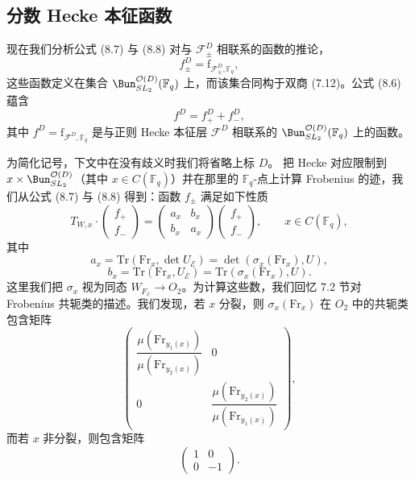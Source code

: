 \subsection{分数 Hecke 本征函数}

现在我们分析公式 (8.7) 与 (8.8) 对与 $\mathcal{F}^D_\pm$ 相联系的函数的推论，
\[
f^D_\pm = \mathrm{f}_{\mathcal{F}^D_\pm,\mathbb{F}_q},
\]
这些函数定义在集合 $\Bun^{\mathcal{O}(D)}_{SL_2}(\mathbb{F}_q)$ 上，而该集合同构于双商 (7.12)。公式 (8.6) 蕴含
\begin{equation}\tag{8.10}
f^D = f^D_+ + f^D_-,
\end{equation}
其中 $f^D = \mathrm{f}_{\mathcal{F}^D,\mathbb{F}_q}$ 是与正则 Hecke 本征层 $\mathcal{F}^D$ 相联系的 $\Bun^{\mathcal{O}(D)}_{SL_2}(\mathbb{F}_q)$ 上的函数。

为简化记号，下文中在没有歧义时我们将省略上标 $D$。
把 Hecke 对应限制到 $x\times \Bun^{\mathcal{O}(D)}_{SL_2}$（其中 $x\in C(\mathbb{F}_q)$）并在那里的 $\mathbb{F}_q$-点上计算 Frobenius 的迹，我们从公式 (8.7) 与 (8.8) 得到：函数 $f_\pm$ 满足如下性质
\begin{equation}\tag{8.11}
T_{W,x}\cdot \begin{pmatrix} f_+\\ f_-\end{pmatrix} = \begin{pmatrix} a_x & b_x\\ b_x & a_x\end{pmatrix}\begin{pmatrix} f_+\\ f_-\end{pmatrix}, \qquad x\in C(\mathbb{F}_q),
\end{equation}
其中
\[
a_x = \mathrm{Tr}(\mathrm{Fr}_x, \det U_{\mathcal{E}}) = \det(\sigma_x(\mathrm{Fr}_x), U),
\]
\[
b_x = \mathrm{Tr}(\mathrm{Fr}_x, U_{\mathcal{E}}) = \mathrm{Tr}(\sigma_x(\mathrm{Fr}_x), U).
\]
这里我们把 $\sigma_x$ 视为同态 $W_{F_x}\to O_2$。为计算这些数，我们回忆 7.2 节对 Frobenius 共轭类的描述。我们发现，若 $x$ 分裂，则 $\sigma_x(\mathrm{Fr}_x)$ 在 $O_2$ 中的共轭类包含矩阵
\[
\begin{pmatrix}
\dfrac{\mu(\mathrm{Fr}_{y_1(x)})}{\mu(\mathrm{Fr}_{y_2(x)})} & 0\\[10pt]
0 & \dfrac{\mu(\mathrm{Fr}_{y_2(x)})}{\mu(\mathrm{Fr}_{y_1(x)})}
\end{pmatrix},
\]
而若 $x$ 非分裂，则包含矩阵
\[
\begin{pmatrix} 1 & 0\\ 0 & -1\end{pmatrix}.
\]
